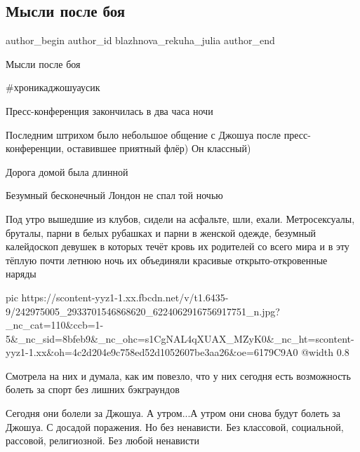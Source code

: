  
 
 
 
 
 
\subsection{Мысли после боя}
\label{sec:27_09_2021.fb.blazhnova_rekuha_julia.1.mysli_posle_boja_usik}
 
\ifcmt
 author_begin
   author_id blazhnova_rekuha_julia
 author_end
\fi

Мысли после боя 

\#хроникаджошуаусик 

Пресс-конференция закончилась в два часа ночи

Последним штрихом было небольшое общение с Джошуа после пресс-конференции,
оставившее приятный флёр) Он классный)

Дорога домой была длинной

Безумный бесконечный Лондон не спал той ночью

Под утро вышедшие из клубов, сидели на асфальте, шли, ехали. Метросексуалы,
бруталы, парни в белых рубашках и парни в женской одежде, безумный калейдоскоп
девушек в которых течёт кровь их родителей со всего мира и в эту тёплую почти
летнюю ночь их объединяли красивые открыто-откровенные наряды

\ifcmt
  pic https://scontent-yyz1-1.xx.fbcdn.net/v/t1.6435-9/242975005_2933701546868620_6224062916756917751_n.jpg?_nc_cat=110&ccb=1-5&_nc_sid=8bfeb9&_nc_ohc=s1CgNAL4qXUAX_MZyK0&_nc_ht=scontent-yyz1-1.xx&oh=4c2d204e9c758ed52d1052607be3aa26&oe=6179C9A0
  @width 0.8
\fi

Смотрела на них и думала, как им повезло, что у них сегодня есть возможность
болеть за спорт без лишних бэкграундов 

Сегодня они болели за Джошуа. А утром...А утром они снова будут болеть за
Джошуа. С досадой поражения. Но без ненависти. Без классовой, социальной,
рассовой, религиозной. Без любой ненависти 

